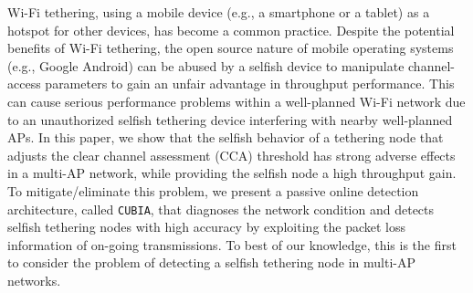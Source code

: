 Wi-Fi tethering, using a mobile device (e.g., a smartphone or a
tablet) as a hotspot for other devices, has become a common practice.
%
%
%
Despite the potential benefits of Wi-Fi tethering,
the open source nature of mobile operating systems (e.g., Google
Android) can be abused by a selfish device to manipulate channel-access
parameters to gain an unfair advantage in throughput performance.
%
This can cause serious performance problems within a well-planned
Wi-Fi network due to an unauthorized selfish tethering device
interfering with nearby well-planned APs.
%
In this paper, we show that the selfish behavior of a tethering node
that adjusts the clear channel assessment (CCA) threshold has strong
adverse effects in a multi-AP network, while providing the selfish
node a high throughput gain.
%
To mitigate/eliminate this problem, we present a passive online
detection architecture, called {\tt CUBIA}, that diagnoses the network
condition and detects selfish tethering nodes with high accuracy by
exploiting the packet loss information of on-going transmissions.
%
To best of our knowledge, this is the first to consider the
problem of detecting a selfish tethering node in multi-AP networks.
